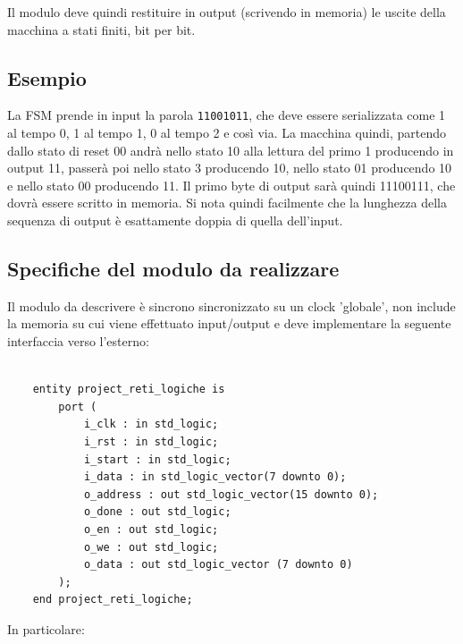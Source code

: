 \documentclass[12pt, a4paper]{article}
\begin{document}
Il modulo deve quindi restituire in output (scrivendo in memoria) le uscite della macchina a stati finiti,
bit per bit. %

\subsection{Esempio}

La FSM prende in input la parola \verb+11001011+, che deve essere serializzata come
1 al tempo 0, 1 al tempo 1, 0 al tempo 2 e così via.
La macchina quindi, partendo dallo stato di reset 00 andrà nello stato 10 alla lettura
del primo 1 producendo in output 11, passerà poi nello stato 3 producendo 10, nello stato 01
producendo 10 e nello stato 00 producendo 11.
Il primo byte di output sarà quindi 11100111, che dovrà essere scritto in memoria.
Si nota quindi facilmente che la lunghezza della sequenza di output è esattamente doppia di quella 
dell'input.

\pagebreak

\subsection{Specifiche del modulo da realizzare}

Il modulo da descrivere è sincrono sincronizzato su un clock 'globale', non include la memoria su cui viene effettuato input/output e
deve implementare la seguente interfaccia verso l'esterno:

\begin{verbatim}
    
    entity project_reti_logiche is
        port (
            i_clk : in std_logic;
            i_rst : in std_logic;
            i_start : in std_logic;
            i_data : in std_logic_vector(7 downto 0);
            o_address : out std_logic_vector(15 downto 0);
            o_done : out std_logic;
            o_en : out std_logic;
            o_we : out std_logic;
            o_data : out std_logic_vector (7 downto 0)
        );
    end project_reti_logiche;

\end{verbatim}

In particolare:
\end{document}

